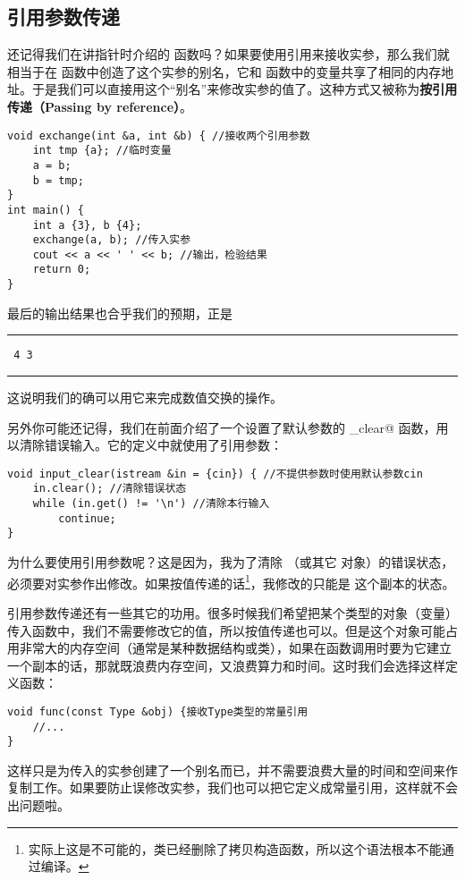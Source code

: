 \subsection*{引用参数传递}
还记得我们在讲指针时介绍的 \lstinline@exchange@ 函数吗？如果要使用引用来接收实参，那么我们就相当于在 \lstinline@exchange@ 函数中创造了这个实参的别名，它和 \lstinline@main@ 函数中的变量共享了相同的内存地址。于是我们可以直接用这个``别名''来修改实参的值了。这种方式又被称为\textbf{按引用传递（Passing by reference）}。
\begin{lstlisting}
void exchange(int &a, int &b) { //接收两个引用参数
    int tmp {a}; //临时变量
    a = b;
    b = tmp;
}
int main() {
    int a {3}, b {4};
    exchange(a, b); //传入实参
    cout << a << ' ' << b; //输出，检验结果
    return 0;
}
\end{lstlisting}
最后的输出结果也合乎我们的预期，正是\\\noindent\rule{\linewidth}{0.2pt}\texttt{
4 3
}\\\noindent\rule{\linewidth}{0.2pt}
这说明我们的确可以用它来完成数值交换的操作。\par
另外你可能还记得，我们在前面介绍了一个设置了默认参数的 \lstinline@input_clear@ 函数，用以清除错误输入。它的定义中就使用了引用参数：
\begin{lstlisting}
void input_clear(istream &in = {cin}) { //不提供参数时使用默认参数cin
    in.clear(); //清除错误状态
    while (in.get() != '\n') //清除本行输入
        continue;
}
\end{lstlisting}
为什么要使用引用参数呢？这是因为，我为了清除 \lstinline@cin@（或其它 \lstinline@istream@ 对象）的错误状态，必须要对实参作出修改。如果按值传递的话\footnote{实际上这是不可能的，\lstinline@istream@ 类已经删除了拷贝构造函数，所以这个语法根本不能通过编译。}，我修改的只能是 \lstinline@in@ 这个副本的状态。\par
引用参数传递还有一些其它的功用。很多时候我们希望把某个类型的对象（变量）传入函数中，我们不需要修改它的值，所以按值传递也可以。但是这个对象可能占用非常大的内存空间（通常是某种数据结构或类），如果在函数调用时要为它建立一个副本的话，那就既浪费内存空间，又浪费算力和时间。这时我们会选择这样定义函数：
\begin{lstlisting}
void func(const Type &obj) {接收Type类型的常量引用
    //...
}
\end{lstlisting}
这样只是为传入的实参创建了一个别名而已，并不需要浪费大量的时间和空间来作复制工作。如果要防止误修改实参，我们也可以把它定义成常量引用，这样就不会出问题啦。\par

